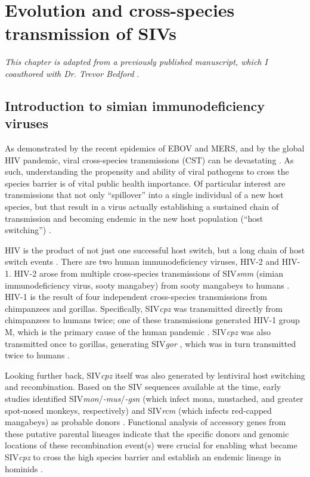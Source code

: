 
\chapter{Evolution and cross-species transmission of SIVs}
\textit{This chapter is adapted from a previously published manuscript, which I coauthored with Dr. Trevor Bedford} \citep{bell2017modern,bell2017thesis}.

\section{Introduction to simian immunodeficiency viruses}
As demonstrated by the recent epidemics of EBOV and MERS, and by the global HIV pandemic, viral cross-species transmissions (CST) can be devastating \citep{morens2008emerging,parrish2008cross}.
As such, understanding the propensity and ability of viral pathogens to cross the species barrier is of vital public health importance.
Of particular interest are transmissions that not only “spillover” into a single individual of a new host species, but that result in a virus actually establishing a sustained chain of transmission and becoming endemic in the new host population (“host switching”) \citep{locatelli2012cross}.

HIV is the product of not just one successful host switch, but a long chain of host switch events \citep{apetrei2004history,sharp2011origins}.
There are two human immunodeficiency viruses, HIV-2 and HIV-1.
HIV-2 arose from multiple cross-species transmissions of SIV\textit{smm} (simian immunodeficiency virus, sooty mangabey) from sooty mangabeys to humans \citep{chen1996genetic,gao1992human,hirsch1989african}.
HIV-1 is the result of four independent cross-species transmissions from chimpanzees and gorillas.
Specifically, SIV\textit{cpz} was transmitted directly from chimpanzees to humans twice; one of these transmissions generated HIV-1 group M, which is the primary cause of the human pandemic \citep{gao1999origin}.
SIV\textit{cpz} was also transmitted once to gorillas, generating SIV\textit{gor} \citep{van2006human}, which was in turn transmitted twice to humans \citep{d2015origin}.

Looking further back, SIV\textit{cpz} itself was also generated by lentiviral host switching and recombination.
Based on the SIV sequences available at the time, early studies identified SIV\textit{mon}/\textit{-mus}/\textit{-gsn} (which infect mona, mustached, and greater spot-nosed monkeys, respectively) and SIV\textit{rcm} (which infects red-capped mangabeys) as probable donors \citep{bailes2003hybrid}.
Functional analysis of accessory genes from these putative parental lineages indicate that the specific donors and genomic locations of these recombination event(s) were crucial for enabling what became SIV\textit{cpz} to cross the high species barrier and establish an endemic lineage in hominids \citep{etienne2013gene}.

